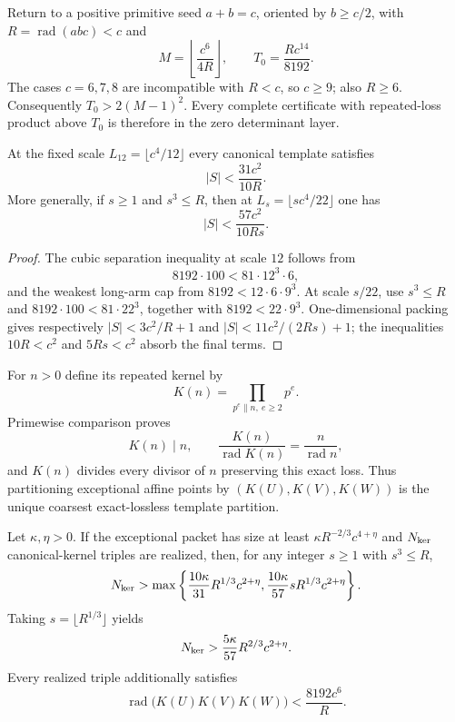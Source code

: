 Return to a positive primitive seed $a+b=c$, oriented by $b\ge c/2$, with
$R=\operatorname{rad}(abc)<c$ and
\[
 M=\left\lfloor\frac{c^6}{4R}\right\rfloor,
 \qquad T_0=\frac{Rc^{14}}{8192}.
\]
The cases $c=6,7,8$ are incompatible with $R<c$, so $c\ge9$; also $R\ge6$.
Consequently $T_0>2(M-1)^2$.  Every complete certificate with repeated-loss
product above $T_0$ is therefore in the zero determinant layer.

\begin{theorem}
\label{thm:canonical-one-dimensional-capacities}
At the fixed scale $L_{12}=\lfloor c^4/12\rfloor$ every canonical template
satisfies
\[
                         |S|<\frac{31c^2}{10R}.
\]
More generally, if $s\ge1$ and $s^3\le R$, then at
$L_s=\lfloor sc^4/22\rfloor$ one has
\[
                         |S|<\frac{57c^2}{10Rs}.
\]
\end{theorem}

\begin{proof}
The cubic separation inequality at scale $12$ follows from
\[
 8192\cdot100<81\cdot12^3\cdot6,
\]
and the weakest long-arm cap from $8192<12\cdot6\cdot9^3$.
At scale $s/22$, use $s^3\le R$ and
$8192\cdot100<81\cdot22^3$, together with
$8192<22\cdot9^3$.  One-dimensional packing gives respectively
$|S|<3c^2/R+1$ and $|S|<11c^2/(2Rs)+1$; the inequalities
$10R<c^2$ and $5Rs<c^2$ absorb the final terms.
\end{proof}

For $n>0$ define its repeated kernel by
\[
 K(n)=\prod_{p^e\parallel n,\ e\ge2}p^e.
\]
Primewise comparison proves
\[
 K(n)\mid n,\qquad
 \frac{K(n)}{\operatorname{rad}K(n)}=
 \frac n{\operatorname{rad}n},
\]
and $K(n)$ divides every divisor of $n$ preserving this exact loss.  Thus
partitioning exceptional affine points by
$(K(U),K(V),K(W))$ is the unique coarsest exact-lossless template partition.

\begin{corollary}
\label{cor:forced-canonical-kernel-entropy}
Let $\kappa,\eta>0$.  If the exceptional packet has size at least
$\kappa R^{-2/3}c^{4+\eta}$ and $N_{\rm ker}$ canonical-kernel triples are
realized, then, for any integer $s\ge1$ with $s^3\le R$,
\[
 N_{\rm ker}>
 \max\left\{\frac{10\kappa}{31}R^{1/3}c^{2+\eta},
             \frac{10\kappa}{57}sR^{1/3}c^{2+\eta}\right\}.
\]
Taking $s=\lfloor R^{1/3}\rfloor$ yields
\[
 N_{\rm ker}>\frac{5\kappa}{57}R^{2/3}c^{2+\eta}.
\]
Every realized triple additionally satisfies
\[
 \operatorname{rad}\bigl(K(U)K(V)K(W)\bigr)
 <\frac{8192c^6}{R}.
\]
\end{corollary}

